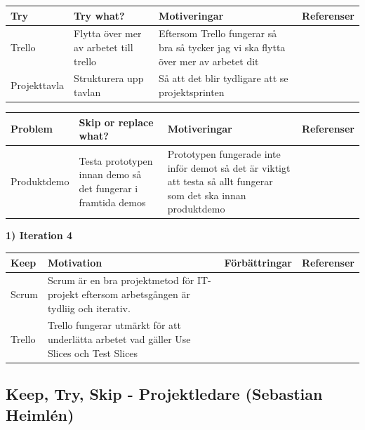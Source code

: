 \documentclass[conference,a4paper]{IEEEtran}
\newcommand\Tstrut{\rule{0pt}{2.6ex}}       %
\newcommand\Bstrut{\rule[-0.9ex]{0pt}{0pt}} %
\newcommand{\TBstrut}{\Tstrut\Bstrut} %
\begin{document}
\begin{table}[H]
	\small
  \centering
	\begin{tabular}{|p{1.5cm}|p{2cm}|p{1.8cm}|p{1.5cm}|} %
    \hline
    Try & Try what? & Motiveringar & Referenser \TBstrut \\
    \hline
    Trello & Flytta över mer av arbetet till trello & Eftersom Trello fungerar så bra så tycker jag vi ska flytta över mer av arbetet dit & \TBstrut \\
    \hline
    Projekttavla & Strukturera upp tavlan & Så att det blir tydligare att se projektsprinten & \TBstrut \\
    \hline
  \end{tabular}
\end{table}

\begin{table}[H]
	\small
  \centering
	\begin{tabular}{|p{1.5cm}|p{2cm}|p{1.8cm}|p{1.5cm}|} %
    \hline
    Problem & Skip or replace what? & Motiveringar & Referenser \TBstrut \\
    \hline
    Produktdemo & Testa prototypen innan demo så det fungerar i framtida demos & Prototypen fungerade inte inför demot så det är viktigt att testa så allt fungerar som det ska innan produktdemo &\TBstrut \\
    \hline
  \end{tabular}
\end{table}

\textbf{1) Iteration 4}


\begin{table}[H]
	\small
  \centering
	\begin{tabular}{|p{1.5cm}|p{2cm}|p{1.8cm}|p{1.5cm}|} %
    \hline
    Keep & Motivation & Förbättringar & Referenser \TBstrut \\
    \hline
    Scrum & Scrum är en bra projektmetod för IT-projekt eftersom arbetsgången är tydliig och iterativ. &  &\TBstrut \\
    \hline
   Trello & Trello fungerar utmärkt för att underlätta arbetet vad gäller Use Slices och Test Slices &  &\TBstrut \\
    \hline
  \end{tabular}
\end{table}



\subsection{Keep, Try, Skip - Projektledare (Sebastian Heimlén)}
\end{document}
